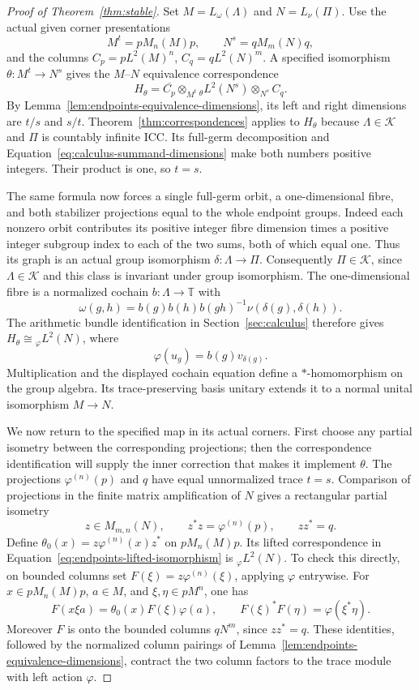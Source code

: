 \begin{proof}[Proof of Theorem~\ref{thm:stable}]
Set \(M=L_\omega(\Lambda)\) and \(N=L_\nu(\Pi)\).
Use the actual given corner presentations
\[
 M^t=pM_n(M)p,\qquad N^s=qM_m(N)q,
\]
and the columns \(C_p=pL^2(M)^n\), \(C_q=qL^2(N)^m\).
A specified isomorphism \(\theta:M^t\to N^s\) gives the
\(M\)--\(N\) equivalence correspondence
\begin{equation}
 H_\theta=\overline{C_p}\otimes_{M^t}
 {}_\theta L^2(N^s)\otimes_{N^s}C_q.
 \label{eq:endpoints-lifted-isomorphism}
\end{equation}
By Lemma~\ref{lem:endpoints-equivalence-dimensions}, its left and right
dimensions are \(t/s\) and \(s/t\). Theorem~\ref{thm:correspondences}
applies to \(H_\theta\) because \(\Lambda\in\mathscr K\) and
\(\Pi\) is countably infinite ICC. Its full-germ decomposition and
Equation~\eqref{eq:calculus-summand-dimensions} make both numbers
positive integers. Their product is one, so \(t=s\).

The same formula now forces a single full-germ orbit, a
one-dimensional fibre, and both stabilizer projections equal to the
whole endpoint groups.  Indeed each nonzero orbit contributes its
positive integer fibre dimension times a positive integer subgroup
index to each of the two sums, both of which equal one.  Thus its
graph is an actual group isomorphism \(\delta:\Lambda\to\Pi\).
Consequently \(\Pi\in\mathscr K\), since \(\Lambda\in\mathscr K\)
and this class is invariant under group isomorphism.
The one-dimensional fibre is a normalized cochain \(b:\Lambda\to
\mathbb T\) with
\[
 \omega(g,h)=b(g)b(h)b(gh)^{-1}\nu(\delta(g),\delta(h)).
\]
The arithmetic bundle identification in Section~\ref{sec:calculus}
therefore gives
\(H_\theta\cong {}_\varphi L^2(N)\), where
\[
 \varphi(u_g)=b(g)v_{\delta(g)}.
\]
Multiplication and the displayed cochain equation define a
\(*\)-homomorphism on the group algebra.  Its trace-preserving basis
unitary extends it to a normal unital isomorphism \(M\to N\).

We now return to the specified map in its actual corners. First choose
any partial isometry between the corresponding projections; then the
correspondence identification will supply the inner correction that makes
it implement \(\theta\). The projections
\(\varphi^{(n)}(p)\) and \(q\) have equal unnormalized trace \(t=s\).
Comparison of projections in the finite matrix amplification of
\(N\) gives a rectangular partial isometry
\[
 z\in M_{m,n}(N),\qquad
 z^*z=\varphi^{(n)}(p),\qquad zz^*=q.
\]
Define
\(\theta_0(x)=z\varphi^{(n)}(x)z^*\) on \(pM_n(M)p\).
Its lifted correspondence in
Equation~\eqref{eq:endpoints-lifted-isomorphism} is
\({}_\varphi L^2(N)\).  To check this directly, on bounded columns
set $F(\xi)=z\varphi^{(n)}(\xi)$, applying $\varphi$ entrywise.
For $x\in pM_n(M)p$, $a\in M$, and $\xi,\eta\in pM^{n}$, one has
\[
 F(x\xi a)=\theta_0(x)F(\xi)\varphi(a),\qquad
 F(\xi)^*F(\eta)=\varphi(\xi^*\eta).
\]
Moreover $F$ is onto the bounded columns $qN^m$, since $zz^*=q$.
These identities, followed by the normalized column pairings of
Lemma~\ref{lem:endpoints-equivalence-dimensions}, contract the two
column factors to the trace module with left action \(\varphi\).


\end{proof}
